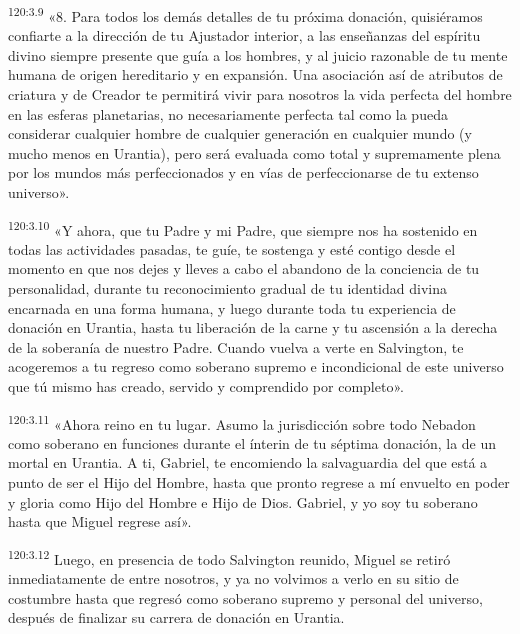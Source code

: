 \par 
\textsuperscript{120:3.9} «8. Para todos los demás detalles de tu próxima donación, quisiéramos confiarte a la dirección de tu Ajustador interior, a las enseñanzas del espíritu divino siempre presente que guía a los hombres, y al juicio razonable de tu mente humana de origen hereditario y en expansión. Una asociación así de atributos de criatura y de Creador te permitirá vivir para nosotros la vida perfecta del hombre en las esferas planetarias, no necesariamente perfecta tal como la pueda considerar cualquier hombre de cualquier generación en cualquier mundo (y mucho menos en Urantia), pero será evaluada como total y supremamente plena por los mundos más perfeccionados y en vías de perfeccionarse de tu extenso universo».

\par 
\textsuperscript{120:3.10} «Y ahora, que tu Padre y mi Padre, que siempre nos ha sostenido en todas las actividades pasadas, te guíe, te sostenga y esté contigo desde el momento en que nos dejes y lleves a cabo el abandono de la conciencia de tu personalidad, durante tu reconocimiento gradual de tu identidad divina encarnada en una forma humana, y luego durante toda tu experiencia de donación en Urantia, hasta tu liberación de la carne y tu ascensión a la derecha de la soberanía de nuestro Padre. Cuando vuelva a verte en Salvington, te acogeremos a tu regreso como soberano supremo e incondicional de este universo que tú mismo has creado, servido y comprendido por completo».

\par 
\textsuperscript{120:3.11} «Ahora reino en tu lugar. Asumo la jurisdicción sobre todo Nebadon como soberano en funciones durante el ínterin de tu séptima donación, la de un mortal en Urantia. A ti, Gabriel, te encomiendo la salvaguardia del que está a punto de ser el Hijo del Hombre, hasta que pronto regrese a mí envuelto en poder y gloria como Hijo del Hombre e Hijo de Dios. Gabriel, y yo soy tu soberano hasta que Miguel regrese así».

\par 
\textsuperscript{120:3.12} Luego, en presencia de todo Salvington reunido, Miguel se retiró inmediatamente de entre nosotros, y ya no volvimos a verlo en su sitio de costumbre hasta que regresó como soberano supremo y personal del universo, después de finalizar su carrera de donación en Urantia.

